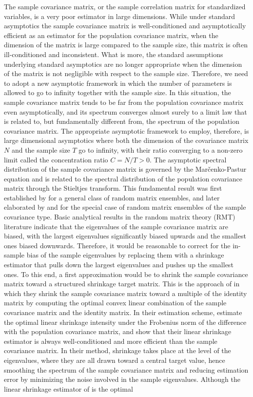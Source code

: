 The sample covariance matrix, or the sample correlation matrix for standardized variables, is a very poor estimator in large dimensions. While under standard asymptotics the sample covariance matrix is well-conditioned and asymptotically efficient as an estimator for the population covariance matrix, when the dimension of the matrix is large compared to the sample size, this matrix is often ill-conditioned and inconsistent. What is more, the standard assumptions underlying standard asymptotics are no longer appropriate when the dimension of the matrix is not negligible with respect to the sample size. Therefore, we need to adopt a new asymptotic framework in which the number of parameters is allowed to go to infinity together with the sample size. In this situation, the sample covariance matrix tends to be far from the population covariance matrix even asymptotically, and its spectrum converges almost surely to a limit law that is related to, but fundamentally different from, the spectrum of the population covariance matrix. The appropriate asymptotic framework to employ, therefore, is large dimensional asymptotics where both the dimension of the covariance matrix $N$ and the sample size $T$ go to infinity, with their ratio converging to a non-zero limit called the concentration ratio $C=N/T > 0$. The asymptotic spectral distribution of the sample covariance matrix is governed by the Marčenko-Pastur equation and is related to the spectral distribution of the population covariance matrix through the Stieltjes transform. This fundamental result was first established by \textcite{MP1967} for a general class of random matrix ensembles, and later elaborated by \textcite{SILVERSTEIN1995} and \textcite{SILVERSTEIN_CHOI_1995} for the special case of random matrix ensembles of the sample covariance type. Basic analytical results in the random matrix theory (RMT) literature indicate that the eigenvalues of the sample covariance matrix are biased, with the largest eigenvalues significantly biased upwards and the smallest ones biased downwards. Therefore, it would be reasonable to correct for the in-sample bias of the sample eigenvalues by replacing them with a shrinkage estimator that pulls down the largest eigenvalues and pushes up the smallest ones. To this end, a first approximation would be to shrink the sample covariance matrix toward a structured shrinkage target matrix. This is the approach of \textcite{LEDOITWOLF2004} in which they shrink the sample covariance matrix toward a multiple of the identity matrix by computing the optimal convex linear combination of the sample covariance matrix and the identity matrix. In their estimation scheme, \textcite{LEDOITWOLF2004} estimate the optimal linear shrinkage intensity under the Frobenius norm of the difference with the population covariance matrix, and show that their linear shrinkage estimator is always well-conditioned and more efficient than the sample covariance matrix. In their method, shrinkage takes place at the level of the eigenvalues, where they are all drawn toward a central target value, hence smoothing the spectrum of the sample covariance matrix and reducing estimation error by minimizing the noise involved in the sample eigenvalues. Although the linear shrinkage estimator of \textcite{LEDOITWOLF2004} is the optimal 
